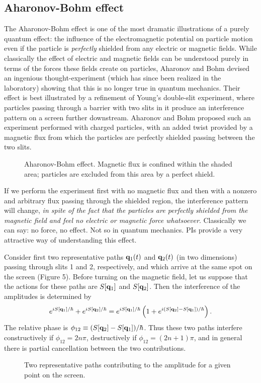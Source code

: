 \documentclass[12pt]{article}
\begin{document}
\subsection{Aharonov-Bohm effect}
The Aharonov-Bohm effect is one of the most dramatic illustrations of
a purely quantum effect: the influence of the electromagnetic
potential on particle motion even if the particle is {\em perfectly}
shielded from any electric or magnetic fields. While classically the
effect of electric and magnetic fields can be understood purely in
terms of the forces these fields create on particles, Aharonov and
Bohm devised an ingenious thought-experiment (which has since been
realized in the laboratory) showing that this is no longer true in
quantum mechanics. Their effect is best illustrated by a refinement of
Young's double-slit experiment, where particles passing through a
barrier with two slits in it produce an interference
pattern on a screen further downstream.
Aharonov and Bohm proposed such an experiment performed with
charged particles, with an added twist provided
by a magnetic flux from which
the particles are perfectly shielded passing between the two slits.
\begin{figure}[hb]
\epsfysize=7cm
\centerline{}
\caption[Aharonov-Bohm effect.]{Aharonov-Bohm effect. Magnetic flux
is confined within the shaded area; particles are excluded from
this area by a perfect shield.}
\end{figure}
If we perform the experiment first with no magnetic flux and then with
a nonzero and arbitrary flux passing through the shielded region, the
interference pattern will change, {\em in spite of the fact that the
  particles are perfectly shielded from the magnetic field and feel no
  electric or magnetic force whatsoever}. Classically we can say: no
force, no effect. Not so in quantum mechanics.
PIs provide a very attractive way of
understanding this effect.

Consider first two representative
paths ${\mathbf q}_1(t)$ and ${\mathbf q}_2(t)$ (in two dimensions)
passing through slits 1 and 2, respectively, and which arrive at
the same spot on the screen (Figure 5). 
Before turning on the magnetic field,
let us suppose that the actions for these paths are $S[{\mathbf q}_1]$ and
$S[{\mathbf q}_2]$. Then the interference of the amplitudes is determined by
\[ 
e^{iS[{\mathbf q}_1]/\hbar}+e^{iS[{\mathbf q}_2]/\hbar}
=e^{iS[{\mathbf q}_1]/\hbar}
\left(1+e^{i(S[{\mathbf q}_2]-S[{\mathbf q}_1])/\hbar}\right).
\]
The relative phase is $\phi_{12}\equiv(S[{\mathbf q}_2]-S[{\mathbf q}_1])/\hbar$. 
Thus these two paths
interfere constructively if $\phi_{12}=2n\pi$,
destructively if $\phi_{12}=(2n+1)\pi$, and in general there is partial
cancellation between the two contributions.
\begin{figure}[hb]
\epsfysize=5cm
\centerline{}
\caption{Two representative paths contributing to the amplitude for a
  given point on the screen.}
\end{figure}
\end{document}
